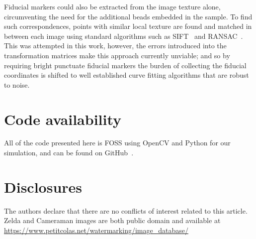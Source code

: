 \documentclass{osa-article}
\begin{document}
Fiducial markers could also be extracted from the image texture alone, circumventing the need for the additional beads embedded in the sample.
To find such correspondences, points with similar local texture are found and matched in between each image using standard algorithms such as SIFT~\cite{loweObjectRecognitionLocal1999} and RANSAC~\cite{fischlerRandomSampleConsensus1981}. %
This was attempted in this work, however, the errors introduced into the transformation matrices make this approach currently unviable; and so by requiring bright punctuate fiducial markers the burden of collecting the fiducial coordinates is shifted to well established curve fitting algorithms that are robust to noise.


\section*{Code availability}
All of the code presented here is FOSS using OpenCV and Python for our simulation, and can be found on GitHub~\cite{craig_russell_2020_4073437}.

\section*{Disclosures}
The authors declare that there are no conflicts of interest related to this article.
Zelda and Cameraman images are both public domain and available at \url{https://www.petitcolas.net/watermarking/image_database/}


\onecolumn
\newpage
%
\end{document}
